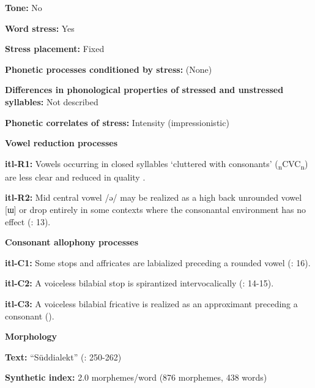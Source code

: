\textbf{Tone:} No



\textbf{Word stress:} Yes



\textbf{Stress placement:} Fixed



\textbf{Phonetic processes conditioned by stress:} (None)



\textbf{Differences in phonological properties of stressed and unstressed syllables:} Not described



\textbf{Phonetic correlates of stress:} Intensity (impressionistic)



\textbf{Vowel reduction processes}



\textbf{itl-R1:} Vowels occurring in closed syllables ‘cluttered with consonants’ (\textsubscript{n}CVC\textsubscript{n}) are less clear and reduced in quality \citep[73]{Volodin1976}.



\textbf{itl-R2:} Mid central vowel /ə/ may be realized as a high back unrounded vowel [ɯ] or drop entirely in some contexts where the consonantal environment has no effect (\citealt{GeorgVolodin1999}: 13).



\textbf{Consonant allophony processes}



\textbf{itl-C1:} Some stops and affricates are labialized preceding a rounded vowel (\citealt{GeorgVolodin1999}: 16).



\textbf{itl-C2:} A voiceless bilabial stop is spirantized intervocalically (\citealt{GeorgVolodin1999}: 14-15).



\textbf{itl-C3:} A voiceless bilabial fricative is realized as an approximant preceding a consonant (\citealt{GeorgVolodin1999}).



\textbf{Morphology}



\textbf{Text:} “Süddialekt” (\citealt{GeorgVolodin1999}: 250-262)



\textbf{Synthetic index:} 2.0 morphemes/word (876 morphemes, 438 words)




